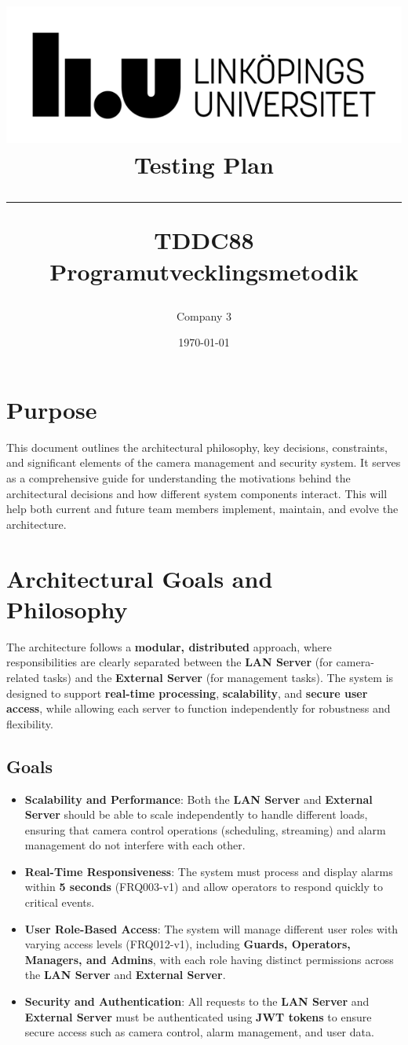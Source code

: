 \documentclass{article}
\title{
\includegraphics[scale=1.5]{liu_logga.png} \\
\vspace{2.0cm} \textbf{Testing Plan} \\
 \endgraf\rule{\textwidth}{.4pt}
  \large \textbf{TDDC88 Programutvecklingsmetodik}\\
   }
\author{Company 3}
\date{\today}
\begin{document}
\maketitle


\newpage
 

\newpage
\tableofcontents
\newpage

\section{Purpose}
This document outlines the architectural philosophy, key decisions, constraints, and significant elements of the camera management and security system. It serves as a comprehensive guide for understanding the motivations behind the architectural decisions and how different system components interact. This will help both current and future team members implement, maintain, and evolve the architecture.

\section{Architectural Goals and Philosophy}

The architecture follows a \textbf{modular, distributed} approach, where responsibilities are clearly separated between the \textbf{LAN Server} (for camera-related tasks) and the \textbf{External Server} (for management tasks). The system is designed to support \textbf{real-time processing}, \textbf{scalability}, and \textbf{secure user access}, while allowing each server to function independently for robustness and flexibility.

\subsection{Goals}

\begin{itemize}
    \item \textbf{Scalability and Performance}: Both the \textbf{LAN Server} and \textbf{External Server} should be able to scale independently to handle different loads, ensuring that camera control operations (scheduling, streaming) and alarm management do not interfere with each other.
    \item \textbf{Real-Time Responsiveness}: The system must process and display alarms within \textbf{5 seconds} (FRQ003-v1) and allow operators to respond quickly to critical events.
    \item \textbf{User Role-Based Access}: The system will manage different user roles with varying access levels (FRQ012-v1), including \textbf{Guards, Operators, Managers, and Admins}, with each role having distinct permissions across the \textbf{LAN Server} and \textbf{External Server}.
    \item \textbf{Security and Authentication}: All requests to the \textbf{LAN Server} and \textbf{External Server} must be authenticated using \textbf{JWT tokens} to ensure secure access such as camera control, alarm management, and user data.
\end{itemize}
\end{document}
